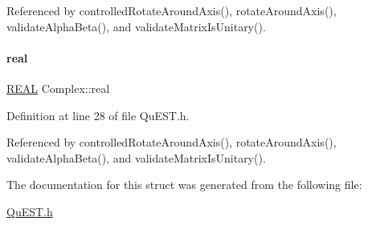 Referenced by controlled\+Rotate\+Around\+Axis(), rotate\+Around\+Axis(), validate\+Alpha\+Beta(), and validate\+Matrix\+Is\+Unitary().

\mbox{\label{structComplex_a479ad939835457595fcca3ca55c06283}} 
\paragraph{\texorpdfstring{real}{real}}
{\footnotesize\ttfamily \mbox{\hyperlink{QuEST__precision_8h_a4b654506f18b8bfd61ad2a29a7e38c25}{R\+E\+AL}} Complex\+::real}



Definition at line 28 of file Qu\+E\+S\+T.\+h.



Referenced by controlled\+Rotate\+Around\+Axis(), rotate\+Around\+Axis(), validate\+Alpha\+Beta(), and validate\+Matrix\+Is\+Unitary().



The documentation for this struct was generated from the following file\+:\begin{DoxyCompactItemize}
\item 
\mbox{\hyperlink{QuEST_8h}{Qu\+E\+S\+T.\+h}}\end{DoxyCompactItemize}
